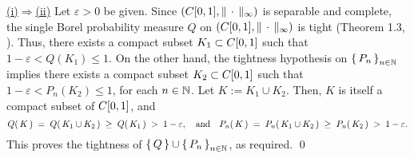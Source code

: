 \vskip 0.3cm
\noindent
\underline{(i)\;$\Longrightarrow$\;(ii)}
\vskip 0.2cm
\noindent
Let $\varepsilon > 0$ be given.
Since $\left(C[0,1],\Vert\,\cdot\,\Vert_{\infty}\right)$ is separable and complete,
the single Borel probability measure $Q$ on $\left(C[0,1],\Vert\,\cdot\,\Vert_{\infty}\right)$ is tight
(Theorem 1.3, \cite{Billingsley1999}).
Thus, there exists a compact subset $K_{1} \subset C[0,1]$ such that $1 - \varepsilon < Q(K_{1}) \leq 1$.
On the other hand, the tightness hypothesis on $\left\{\,P_{n}\,\right\}_{n\in\mathbb{N}}$ implies there exists
a compact subset $K_{2} \subset C[0,1]$ such that
$1 - \varepsilon < P_{n}(K_{2}) \leq 1$, for each $n \in \mathbb{N}$.
Let $K := K_{1} \cup K_{2}$. Then, $K$ is itself a compact subset of $C[0,1]$, and
\begin{equation*}
Q\!\left(\,K\,\right)
\;=\; Q\!\left(\,K_{1} \cup K_{2}\,\right)
\;\geq\; Q\!\left(\,K_{1}\,\right)
\;>\;1 - \varepsilon,
\quad\textnormal{and}\quad
P_{n}\!\left(\,K\,\right)
\;=\; P_{n}\!\left(\,K_{1} \cup K_{2}\,\right)
\;\geq\; P_{n}\!\left(\,K_{2}\,\right)
\;>\;1 - \varepsilon.
\end{equation*}
This proves the tightness of
$\left\{\,Q\,\right\}\cup\left\{\,P_{n}\,\right\}_{n\in\mathbb{N}}$,
as required.
\qed

